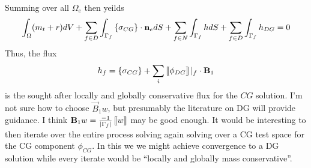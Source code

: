 \documentclass[10pt,dvips,twoside,reqno]{amsart}
\begin{document}
Summing over all $\Omega_e$ then yeilds
\begin{equation}
\int_{\Omega} (m_t + r) dV + \sum_{f \in D} \int_{\Gamma_f} \left\{ \sigma_{CG} \right\} \cdot {\bf n}_e dS + \sum_{f \in N} \int_{\Gamma_f} h dS+ \sum_{f \in D} \int_{\Gamma_f} h_{DG} = 0
\end{equation}
Thus, the flux 
\begin{equation}
h_f = \cbl \sigma_{CG} \cbr + \sum_{i} \dbl \phi_{DG} \dbr|_{f} \cdot \vec B_1
\end{equation}
is the sought after locally and globally conservative flux for the
$CG$ solution. I'm not sure how to choose $\vec B_1 w$, but presumably
the literature on DG will provide guidance. I think $\vec B_1 w =
\frac{-1}{|\Gamma_f|} \dbl w \dbr$ may be good enough. It would be
interesting to then iterate over the entire process solving again
solving over a CG test space for the CG component $\phi_{CG}$.  In
this we we might achieve convergence to a DG solution while every
iterate would be ``locally and globally mass conservative''.
\end{document}
